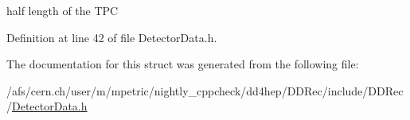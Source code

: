 half length of the TPC 

Definition at line 42 of file DetectorData.h.

The documentation for this struct was generated from the following file:\begin{DoxyCompactItemize}
\item 
/afs/cern.ch/user/m/mpetric/nightly\_\-cppcheck/dd4hep/DDRec/include/DDRec/\hyperlink{_detector_data_8h}{DetectorData.h}\end{DoxyCompactItemize}
